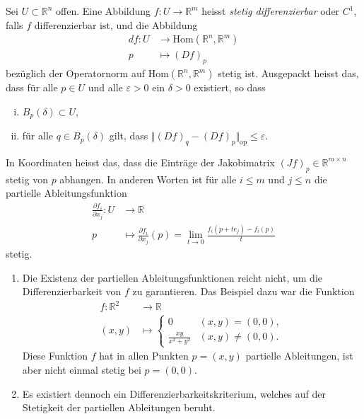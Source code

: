 \documentclass[../main.tex]{subfiles}
\begin{document}
\begin{definition}
  Sei $U \subset \mathbb{R}^n$ offen.
  Eine Abbildung $f \colon U \to \mathbb{R}^m$ heisst
  \emph{stetig differenzierbar} oder $C^1$,
  falls $f$ differenzierbar ist, und die Abbildung
  \begin{align*}
    df \colon U & \to \text{Hom}(\mathbb{R}^n, \mathbb{R}^m) \\
    p & \mapsto {(Df)}_p
  \end{align*}
  bezüglich der Operatornorm auf $\text{Hom}(\mathbb{R}^n, \mathbb{R}^m)$ 
  stetig ist.
  Ausgepackt heisst das, dass für alle $p \in U$ 
  und alle $\varepsilon > 0$ ein $\delta > 0$ 
  existiert, so dass
  \begin{enumerate}[(i)]
    \item $B_p(\delta) \subset U$, 
    \item für alle $q \in B_p(\delta)$ gilt, dass
      $\Vert {(Df)}_q - {(Df)}_p \Vert_{\text{op}} \leq \varepsilon$.
  \end{enumerate}
\end{definition}

In Koordinaten heisst das, dass die Einträge der
Jakobimatrix ${(Jf)}_p \in \mathbb{R}^{m \times n}$ stetig
von $p$ abhangen.
In anderen Worten ist für alle $i \leq m$ und $j \leq n$ 
die partielle Ableitungsfunktion
\begin{align*}
  \frac{\partial f_i}{\partial x_j} \colon U & \to \mathbb{R} \\
  p & \mapsto \frac{\partial f_i}{\partial x_j}(p)
  = \lim_{t \to 0} \frac{f_i(p + te_j) - f_i(p)}{t}
\end{align*}
stetig.

\begin{remarks}
  \leavevmode
  \begin{enumerate}[(1)]
    \item Die Existenz der partiellen Ableitungsfunktionen
      reicht nicht, um die Differenzierbarkeit von $f$ zu garantieren.
      Das Beispiel dazu war die Funktion
      \begin{align*}
        f \colon \mathbb{R}^2 & \to \mathbb{R} \\
        (x, y) & \mapsto 
        \begin{cases}
          0 & (x, y) = (0, 0),\\
          \frac{xy}{x^2 + y^2} & (x, y) \neq (0, 0).
        \end{cases}
      \end{align*}
      Diese Funktion $f$ hat in allen Punkten $p = (x, y)$ partielle
      Ableitungen, ist aber nicht einmal stetig bei $p = (0, 0)$.
    \item Es existiert dennoch ein Differenzierbarkeitskriterium,
      welches auf der Stetigkeit der partiellen Ableitungen beruht.
  \end{enumerate}
\end{remarks}
\end{document}
